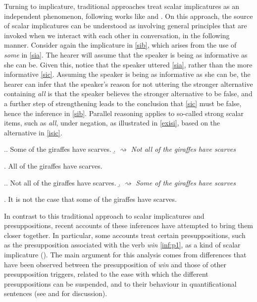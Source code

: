 \documentclass[12pt, letterpaper]{article}
\begin{document}
Turning to implicature, traditional approaches treat scalar implicatures as an independent phenomenon, following works like \cite{Grice:1975} and \cite*{Horn:1972}. On this approach, the source of scalar implicatures can be understood as involving general principles that are invoked when we interact with each other in conversation, in the following manner. Consider again the implicature in \ref{sib}, which arises from the use of \textit{some} in \ref{sia}. The hearer will assume that the speaker is being as informative as she can be. Given this, notice that the speaker uttered \ref{sia}, rather than the more informative \ref{sic}. Assuming the speaker is being as informative as she can be, the hearer can infer that the speaker's reason for not uttering the stronger alternative containing \textit{all} is that the speaker believes the stronger alternative to be false, and a further step of strengthening leads to the conclusion that \ref{sic} must be false, hence the inference in \ref{sib}. Parallel reasoning applies to so-called strong scalar items, such as \textit{all}, under negation, as illustrated in \ref{exisi}, based on the alternative in \ref{isic}.

\ex.\label{exsi}\a. \label{sia} Some of the giraffes have scarves.  
\b. \label{sib} $\rightsquigarrow$ \textit{Not all of the giraffes have scarves}

\ex. \label{sic} All of the giraffes have scarves.

\ex.\label{exisi}\a. \label{isia} Not all of the giraffes have scarves.  
\b. \label{isib} $\rightsquigarrow$ \textit{Some of the giraffes have scarves}

\ex. \label{isic} It is not the case that some of the giraffes have scarves.

In contrast to this traditional approach to scalar implicatures and presuppositions, recent accounts of these inferences have attempted to bring them closer together. In particular, some accounts treat certain presuppositions, such as the presupposition associated with the verb \textit{win} \ref{inf:p1}, as a kind of scalar implicature (\citealt{Simons:2001, Abusch:2002, Abusch:2009, Chemla:2009, Romoli:2012c, Romoli:2014}). The main argument for this analysis comes from differences that have been observed between the presupposition of \textit{win} and those of other presupposition triggers, related to the ease with which the different presuppositions can be suspended, and to their behaviour in quantificational sentences (see \citealt{Abusch:2009} and \citealt{Romoli:2014} for discussion). 
\end{document}
